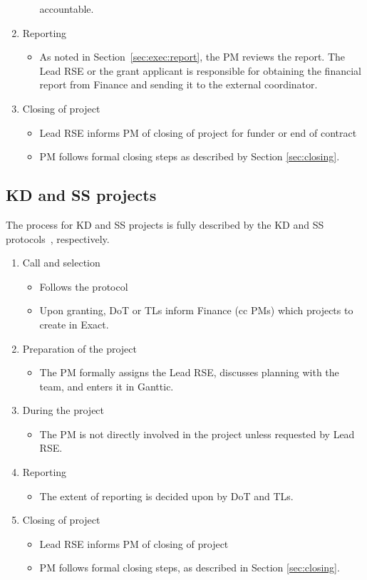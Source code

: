 \begin{enumerate}[label=\arabic*.,ref=\arabic*]
\begin{itemize}
accountable.
\end{itemize}
\item Reporting
\begin{itemize}
\item As noted in Section~\ref{sec:exec:report}, the PM reviews the report. The Lead RSE or the grant applicant is responsible for obtaining the financial report from Finance and sending it to the external coordinator.
\end{itemize}
\item Closing of project
\begin{itemize}
\item Lead RSE informs PM of closing of project for funder or end of contract
\item PM follows formal closing steps as described by Section \ref{sec:closing}.
\end{itemize}
\end{enumerate}




\subsection{KD and SS projects}
The process for KD and SS projects is fully described by the KD and SS protocols~\cite{intranet}, respectively.
\begin{enumerate}[label=\arabic*.,ref=\arabic*]
\item Call and selection
\begin{itemize}
\item Follows the protocol
\item Upon granting, DoT or TLs inform Finance (cc PMs) which projects to create in Exact.
\end{itemize}
\item Preparation of the project
\begin{itemize}
\item The PM formally assigns the Lead RSE, discusses planning with the team, and enters it in Ganttic.
\end{itemize}
\item During the project
\begin{itemize}
\item The PM is not directly involved in the project unless requested by Lead RSE.
\end{itemize}
\item Reporting
\begin{itemize}
\item The extent of reporting is decided upon by DoT and TLs.
\end{itemize}
\item Closing of project
\begin{itemize}
\item Lead RSE informs PM of closing of project
\item PM follows formal closing steps, as described in Section \ref{sec:closing}.
\end{itemize}
\end{enumerate}


